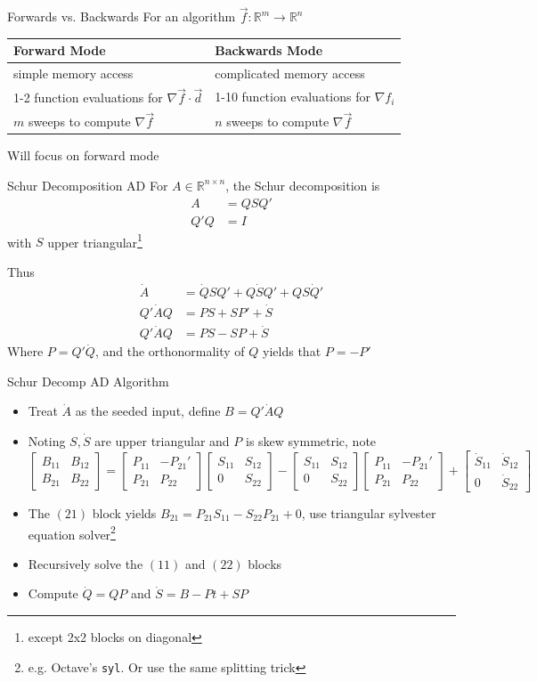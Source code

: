 \documentclass[12pt]{beamer}
\renewcommand{\d}[1]{\dot{#1}}
\newcommand{\fn}[1]{\footnote{\footnotesize #1}}
\newcommand{\grad}{\nabla}
\newcommand{\mat}[4]{\begin{bmatrix} #1 & #2\\#3 & #4\end{bmatrix}}
\begin{document}
  \begin{frame}{Forwards vs. Backwards}
    \centering
    For an algorithm $\vec{f}:\mathbb{R}^m \to \mathbb{R}^n$\\[.5in]
    \begin{table}[h!]
      \begin{tabular}{l | l}
        Forward Mode & Backwards Mode\\\hline
        simple memory access & complicated memory access\\
        1-2 function evaluations for $\grad \vec{f} \cdot \vec{d}$  & 1-10 function evaluations for $\grad f_i$\\
        $m$ sweeps to compute $\grad \vec{f}$ & $n$ sweeps to compute $\grad \vec{f}$
      \end{tabular}
    \end{table}
    Will focus on forward mode
  \end{frame}

  \begin{frame}{Schur Decomposition AD}
    For $A \in \mathbb{R}^{n \times n}$, the Schur decomposition is
    \begin{align*}
      A &= Q S Q'\\
      Q'Q &= I
    \end{align*}
    with $S$ upper triangular\fn{except 2x2 blocks on diagonal}

    Thus
    \begin{align*}
      \d{A} &= \d{Q}SQ' + Q\d{S}Q' + QS\d{Q}'\\
      Q' \d{A} Q &= P S + S P' + \d{S}\\
      Q' \d{A} Q &= P S - S P + \d{S}
    \end{align*}
    Where $P = Q'\d{Q}$, and the orthonormality of $Q$ yields that $P = -P'$

  \end{frame}

  \begin{frame}{Schur Decomp AD Algorithm}
    \begin{itemize}
      \item Treat $\d{A}$ as the seeded input, define $B = Q' \d{A} Q$
      \item Noting $S, \d{S}$ are upper triangular and $P$ is skew symmetric, note
      \begin{equation}
        \mat{B_{11}}{B_{12}}{B_{21}}{B_{22}} = \mat{P_{11}}{-P_{21}'}{P_{21}}{P_{22}} \mat{S_{11}}{S_{12}}{0}{S_{22}} - \mat{S_{11}}{S_{12}}{0}{S_{22}} \mat{P_{11}}{-P_{21}'}{P_{21}}{P_{22}} + \mat{\d{S}_{11}}{\d{S}_{12}}{0}{\d{S}_{22}}
      \end{equation}
      \item The $(21)$ block yields $B_{21} = P_{21}S_{11} - S_{22}P_{21} + 0$, use triangular sylvester equation solver\fn{e.g. Octave's \texttt{syl}. Or use the same splitting trick}
      \item Recursively solve the $(11)$ and $(22)$ blocks
      \item Compute $\d{Q} = QP$ and $\d{S} = B - Pt + SP$
    \end{itemize}
  \end{frame}
\end{document}

